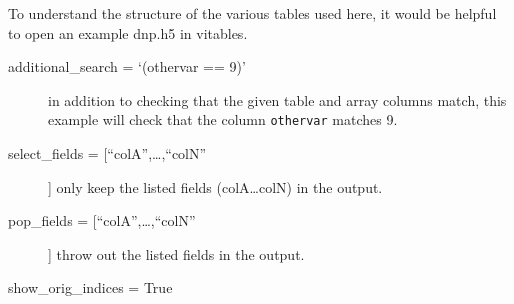To understand the structure of the various tables used here, it
    would be helpful to open an example dnp.h5 in vitables.

    \begin{mykwargs}
        \begin{description}
            \item[additional\_search = `(othervar == 9)']
                in addition to checking that the given table and
                array columns match, this example will check that the
                column \texttt{othervar} matches 9.
            \item[select\_fields = [``colA'',\ldots,``colN''] ] only
                keep the listed fields (colA\ldots colN) in the output.
            \item[pop\_fields = [``colA'',\ldots,``colN''] ] 
                throw out the listed fields in the output.
            \item[show\_orig\_indices = True]
        \end{description}
    \end{mykwargs}

